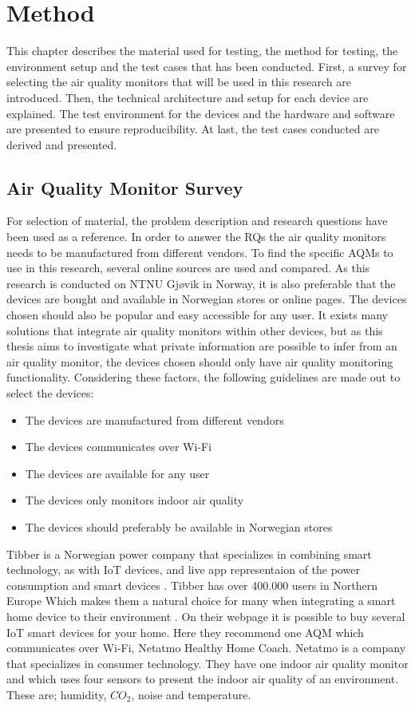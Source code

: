 \chapter{Method}
This chapter describes the material used for testing, the method for testing, the environment setup and the test cases that has been conducted. First, a survey for selecting the air quality monitors that will be used in this research are introduced. Then, the technical architecture and setup for each device are explained. The test environment for the devices and the hardware and software are presented to ensure reproducibility. At last, the test cases conducted are derived and presented. 
\section{Air Quality Monitor Survey}
For selection of material, the problem description and research questions have been used as a reference. In order to answer the RQs the air quality monitors needs to be manufactured from different vendors. To find the specific AQMs to use in this research, several online sources are used and compared. As this research is conducted on NTNU Gjøvik in Norway, it is also preferable that the devices are bought and available in Norwegian stores or online pages. The devices chosen should also be popular and easy accessible for any user. It exists many solutions that integrate air quality monitors within other devices, but as this thesis aims to investigate what private information are possible to infer from an air quality monitor, the devices chosen should only have air quality monitoring functionality.  Considering these factors, the following guidelines are made out to select the devices:
\begin{itemize}
    \item The devices are manufactured from different vendors
    \item The devices communicates over Wi-Fi
    \item The devices are available for any user
    \item The devices only monitors indoor air quality
    \item The devices should preferably be available in Norwegian stores
\end{itemize}
Tibber \cite{Tibber} is a Norwegian power company that specializes in combining smart technology, as with IoT devices, and live app representaion of the power consumption and smart devices \cite{Tibber}.  Tibber has over 400.000 users in Northern Europe Which makes them a natural choice for many when integrating a smart home device to their environment \cite{TibberUsers}. On their webpage it is possible to buy several IoT smart devices for your home. Here they recommend one AQM which communicates over Wi-Fi, Netatmo Healthy Home Coach. Netatmo \cite{Netatmo} is a company that specializes in consumer technology. They have one indoor air quality monitor and which uses four sensors to present the indoor air quality of an environment. These are; humidity, \(CO_2\), noise and temperature. 
